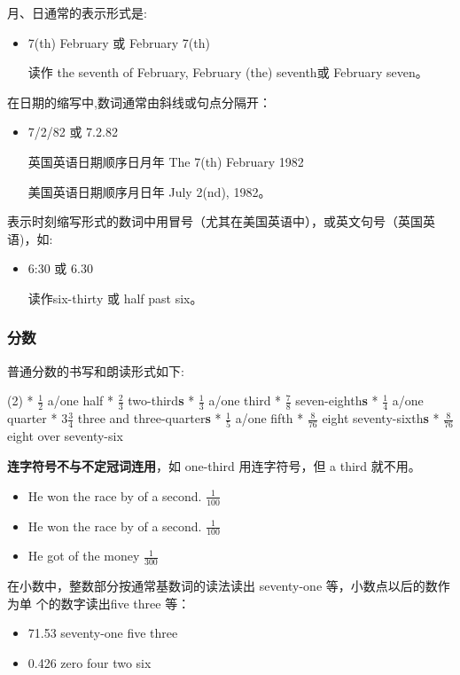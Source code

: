 月、日通常的表示形式是:
\begin{itemize}
\item 7(th) February 或 February 7(th)

  读作 the seventh of February, February (the) seventh或 February seven。
\end{itemize}

在日期的缩写中,数词通常由斜线或句点分隔开：
\begin{itemize}
\item 7/2/82 或 7.2.82

  英国英语日期顺序日月年 The 7(th) February 1982

  美国英语日期顺序月日年 July 2(nd), 1982。
\end{itemize}

表示时刻缩写形式的数词中用冒号（尤其在美国英语中），或英文句号（英国英语)，如:
\begin{itemize}
\item 6:30 或 6.30

  读作six-thirty 或 half past six。
\end{itemize}

\subsubsection{分数}

 普通分数的书写和朗读形式如下:
 \begin{taskitem}(2)
   * $\frac{1}{2}$ a/one half
   * $\frac{2}{3}$ two-third\textbf{s}
   * $\frac{1}{3}$ a/one third
   * $\frac{7}{8}$ seven-eighth\textbf{s}
   * $\frac{1}{4}$ a/one quarter
   * $3\frac{3}{4}$ three and three-quarter\textbf{s}
   * $\frac{1}{5}$ a/one fifth
   * $\frac{8}{76}$ eight seventy-sixth\textbf{s}
   * $\frac{8}{76}$ eight over seventy-six
 \end{taskitem}

\textbf{连字符号不与不定冠词连用}，如 one-third 用连字符号，但 a third 就不用。

\begin{itemize}
\item He won the race by  of a second. $\frac{1}{100}$
\item He won the race by  of a second. $\frac{1}{100}$
\item He got  of the money $\frac{1}{300}$
\end{itemize}

在小数中，整数部分按通常基数词的读法读出 seventy-one 等，小数点以后的数作为单
个的数字读出five three 等：
 \begin{itemize}
 \item 71.53 seventy-one  five three

 \item 0.426  zero  four two six
 \end{itemize}

